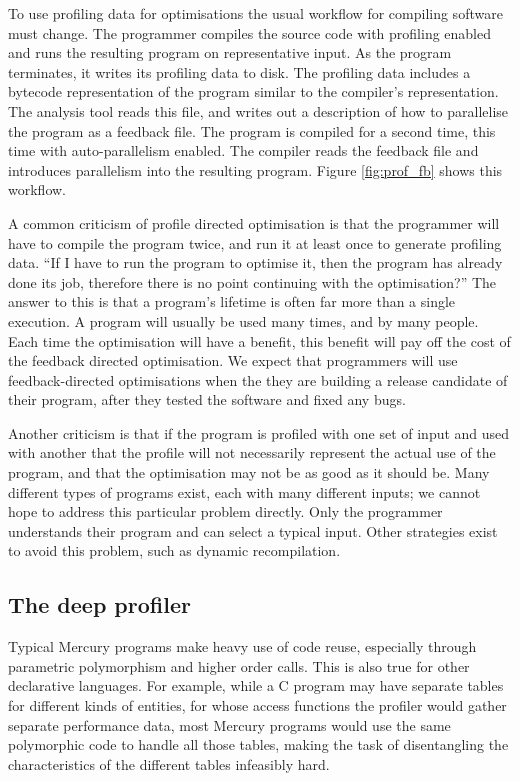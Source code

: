 
To use profiling data for optimisations the usual workflow for compiling
software must change.
The programmer compiles the source code with profiling enabled and runs the
resulting program on representative input.
As the program terminates,
it writes its profiling data to disk.
The profiling data includes a bytecode representation of the program
similar to the compiler's representation.
The analysis tool reads this file,
and writes out a description of how to parallelise the program as a feedback
file.
The program is compiled for a second time,
this time with auto-parallelism enabled.
The compiler reads the feedback file and introduces parallelism into the
resulting program.
Figure \ref{fig:prof_fb} shows this workflow.

A common criticism of profile directed optimisation is that the programmer will
have to compile the program twice,
and run it at least once to generate profiling data.
``If I have to run the program to optimise it, then the program has
already done its job,
therefore there is no point continuing with the optimisation?''
The answer to this is that a program's lifetime is often far more than a
single execution.
A program will usually be used many times, and by many people.
Each time the optimisation will have a benefit,
this benefit will pay off the cost of the feedback directed optimisation.
We expect that programmers will use feedback-directed optimisations when the
they are building a release candidate of their program,
after they tested the software and fixed any bugs.

Another criticism is that if the program is profiled with one set of input and
used with another that the profile will not necessarily represent the actual use
of the program,
and that the optimisation may not be as good as it should be.
Many different types of programs exist, each with many different inputs;
we cannot hope to address this particular problem directly.
Only the programmer understands their program and can select a typical
input.
Other strategies exist to avoid this problem,
such as dynamic recompilation.

\subsection{The deep profiler}
\label{sec:backgnd_deep}

Typical Mercury programs make heavy use of code reuse,
especially through parametric polymorphism and higher order calls.
This is also true for other declarative languages.
For example, while a C program may have
separate tables for different kinds of entities,
for whose access functions
the profiler would gather separate performance data,
most Mercury programs would use
the same polymorphic code to handle all those tables,
making the task of disentangling the characteristics of the different tables
infeasibly hard.

